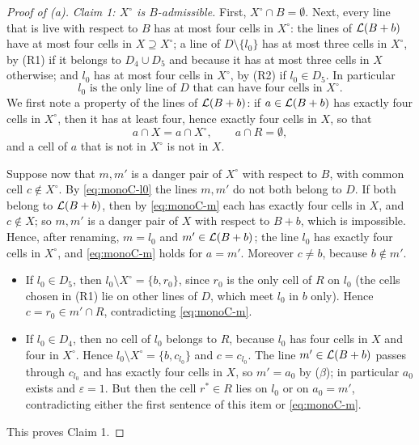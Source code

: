 \begin{proof}[Proof of \textup{(a)}]
\smallskip\noindent\emph{Claim 1: $X^\circ$ is $B$-admissible.}
First, $X^\circ\cap B=\emptyset$. Next, every line that is live with respect to $B$ has at most four cells
in $X^\circ$: the lines of $\mathcal{L}(B+b)$ have at most four cells in $X\supseteq X^\circ$; a line of
$D\setminus\{l_0\}$ has at most three cells in $X^\circ$, by (R1) if it belongs to $D_4\cup D_5$ and
because it has at most three cells in $X$ otherwise; and $l_0$ has at most four cells in $X^\circ$, by
(R2) if $l_0\in D_5$. In particular
\begin{equation}\label{eq:monoC-l0}
  \text{$l_0$ is the only line of $D$ that can have four cells in $X^\circ$.}
\end{equation}
We first note a property of the lines of $\mathcal{L}(B+b)$: if $a\in\mathcal{L}(B+b)$ has exactly four cells in
$X^\circ$, then it has at least four, hence exactly four cells in $X$, so that
\begin{equation}\label{eq:monoC-m}
  a\cap X=a\cap X^\circ,\qquad a\cap R=\emptyset,
\end{equation}
and a cell of $a$ that is not in $X^\circ$ is not in $X$.

Suppose now that $m,m'$ is a danger pair of $X^\circ$ with respect to $B$, with common cell
$c\notin X^\circ$. By \eqref{eq:monoC-l0} the lines $m,m'$ do not both belong to $D$. If both belong to
$\mathcal{L}(B+b)$, then by \eqref{eq:monoC-m} each has exactly four cells in $X$, and $c\notin X$; so $m,m'$ is a
danger pair of $X$ with respect to $B+b$, which is impossible. Hence, after renaming, $m=l_0$ and
$m'\in\mathcal{L}(B+b)$; the line $l_0$ has exactly four cells in $X^\circ$, and \eqref{eq:monoC-m} holds for
$a=m'$. Moreover $c\ne b$, because $b\notin m'$.
\begin{itemize}
\item If $l_0\in D_5$, then $l_0\setminus X^\circ=\{b,r_0\}$, since $r_0$ is the only cell of $R$ on $l_0$
      (the cells chosen in (R1) lie on other lines of $D$, which meet $l_0$ in $b$ only). Hence
      $c=r_0\in m'\cap R$, contradicting \eqref{eq:monoC-m}.
\item If $l_0\in D_4$, then no cell of $l_0$ belongs to $R$, because $l_0$ has four cells in $X$ and four
      in $X^\circ$. Hence $l_0\setminus X^\circ=\{b,c_{l_0}\}$ and $c=c_{l_0}$. The line $m'\in\mathcal{L}(B+b)$
      passes through $c_{l_0}$ and has exactly four cells in $X$, so $m'=a_0$ by ($\beta$); in particular
      $a_0$ exists and $\varepsilon=1$. But then the cell $r^*\in R$ lies on $l_0$ or on $a_0=m'$,
      contradicting either the first sentence of this item or \eqref{eq:monoC-m}.
\end{itemize}
This proves Claim 1.


\end{proof}
